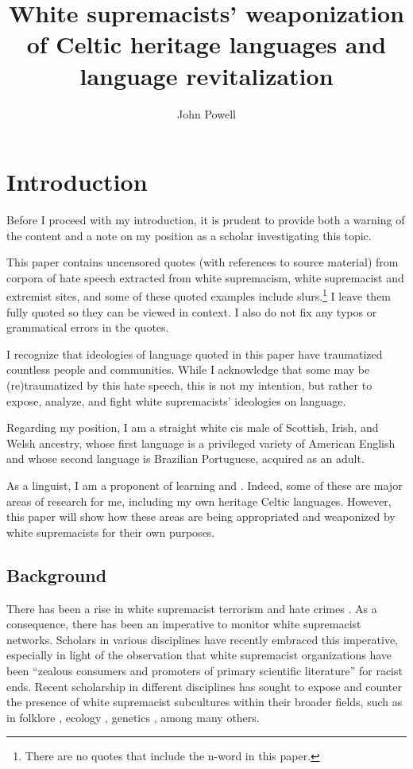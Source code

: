 \documentclass[output=paper,colorlinks,citecolor=brown]{langscibook}
\author{John Powell\orcid{}\affiliation{University of Arizona}}
\title{White supremacists’ weaponization of Celtic heritage languages and language revitalization}
\begin{document}
\maketitle



\section{Introduction}\label{sec:powell:1}

 Before I proceed with my introduction, it is prudent to provide both a warning of the content and a note on my position as a scholar investigating this topic.

This paper contains uncensored quotes (with references to source material) from corpora of hate speech extracted from white supremacism, white supremacist and extremist sites, and some of these quoted examples include slurs.\footnote{There are no quotes that include the n-word in this paper.} I leave them fully quoted so they can be viewed in context. I also do not fix any typos or grammatical errors in the quotes.

I recognize that ideologies of language quoted in this paper have traumatized countless people and communities. While I acknowledge that some may be (re)\-trau\-ma\-tized by this hate speech, this is not my intention, but rather to expose, analyze, and fight white supremacists' ideologies on language.

Regarding my position, I am a straight white cis male of Scottish, Irish, and Welsh ancestry, whose first language is a privileged variety of American English and whose second language is Brazilian Portuguese, acquired as an adult.

As a linguist, I am a proponent of learning  and . Indeed, some of these are major areas of research for me, including my own heritage Celtic languages. However, this paper will show how these areas are being appropriated and weaponized by white supremacists for their own purposes.


\subsection{Background}\label{sec:powell:1.1}

There has been a rise in white supremacist terrorism and hate crimes \citep{jp:Byman2022}. As a consequence, there has been an imperative to monitor white suprem\-a\-cist networks. Scholars in various disciplines have recently embraced this imperative, especially in light of the observation that white supremacist organizations have been ``zealous consumers and promoters of primary scientific literature'' \citep[445]{jp:Carlson2022} for racist ends. Recent scholarship in different disciplines has sought to expose and counter the presence of white supremacist subcultures within their broader fields, such as in folklore \citep{jp:Wilson2021}, ecology \citep{jp:Bergman2021}, genetics \citep{jp:Carlson2022}, among many others.
\end{document}
